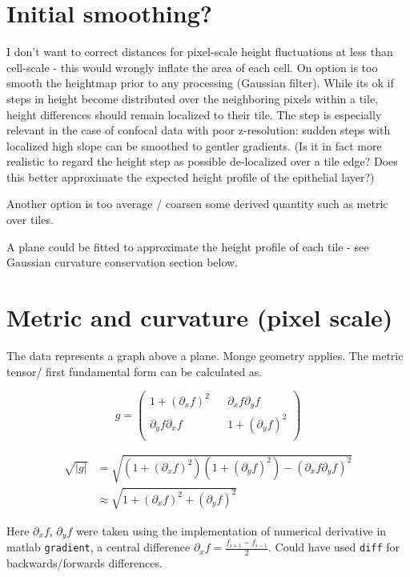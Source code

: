 \documentclass[10pt,a4paper]{article}
\begin{document}
\section{Initial smoothing?}
I don't want to correct distances for pixel-scale height fluctuations at less than cell-scale - this would wrongly inflate the area of each cell.  On option is too smooth the heightmap prior to any processing (Gaussian filter).  While its ok if steps in height become distributed over the neighboring pixels within a tile, height differences should remain localized to their tile.  The step is especially relevant in the case of confocal data with poor z-resolution: sudden steps with localized high slope can be smoothed to gentler gradients.  (Is it in fact more realistic to regard the height step as possible de-localized over a tile edge?  Does this better approximate the expected height profile of the epithelial layer?)

Another option is too average / coarsen some derived quantity such as metric over tiles.

A plane could be fitted to approximate the height profile of each tile - see Gaussian curvature conservation section below.

\section{Metric and curvature (pixel scale)}
The data represents a graph above a plane.  Monge geometry applies.  The metric tensor/ first fundamental form can be calculated as.

\begin{equation}
g =  \begin{pmatrix}
1+(\partial_x f) ^2 &&\partial_x f \partial_y f \\
\partial_y f \partial_x f && 1+ (\partial_y f)^2\\
\end{pmatrix}
\end{equation}

\begin{equation}
\begin{aligned}
\sqrt{|g|} &=  \sqrt{(1 + (\partial_x f)^2)(1 + (\partial_y f)^2)-(\partial_x f \partial_y f)^2}\\
&\approx \sqrt{1 + (\partial_x f)^2 + (\partial_y f)^2}
\end{aligned}
\end{equation}

Here $\partial_x f$, $\partial_y f$ were taken using the implementation of numerical derivative in matlab \texttt{gradient}, a central difference $\partial_x f = \frac{f_{i+1}-f_{i-1}}{2}$.  Could have used \texttt{diff} for backwards/forwards differences.
\end{document}
